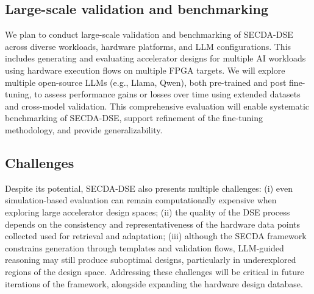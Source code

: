

\subsection{Large-scale validation and benchmarking} 

We plan to conduct large-scale validation and benchmarking of SECDA-DSE across diverse workloads, hardware platforms, and LLM configurations. This includes generating and evaluating accelerator designs for multiple AI workloads using hardware execution flows on multiple FPGA targets. 
We will explore multiple open-source LLMs (e.g., Llama, Qwen), both pre-trained and post fine-tuning, to assess performance gains or losses over time using extended datasets and cross-model validation. This comprehensive evaluation will enable systematic benchmarking of SECDA-DSE, support refinement of the fine-tuning methodology, and provide generalizability.





\subsection{Challenges} 

Despite its potential, SECDA-DSE also presents multiple challenges: (i) even simulation-based evaluation can remain computationally expensive when exploring large accelerator design spaces; 
(ii) the quality of the DSE process depends on the consistency and representativeness of the hardware data points collected used for retrieval and adaptation; 
(iii) although the SECDA framework constrains generation through templates and validation flows, LLM-guided reasoning may still produce suboptimal designs, particularly in underexplored regions of the design space. 
Addressing these challenges will be critical in future iterations of the framework, alongside expanding the hardware design database.